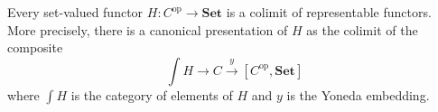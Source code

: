 Every set-valued functor $H: C^{\mathrm{op}} \to \mathbf{Set}$ is a colimit of representable functors. More precisely, there is a canonical presentation of $H$ as the colimit of the composite
$$\int H \to C \xrightarrow{y} [C^{\mathrm{op}}, \mathbf{Set}]$$
where $\int H$ is the category of elements of $H$ and $y$ is the Yoneda embedding.
